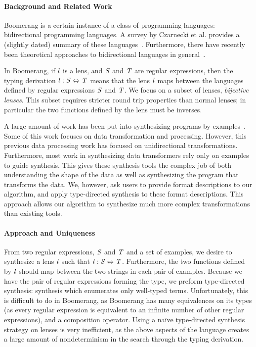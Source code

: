 \documentclass[a4paper,twoside]{article}
\begin{document}
\paragraph*{Background and Related Work}
Boomerang is a certain instance of a class of programming languages:
bidirectional programming languages.  A survey by Czarnecki et al. provides a (slightly dated)
summary of these languages~\cite{DBLP:conf/icmt/CzarneckiFHLST09}.  Furthermore, there have recently been
theoretical approaches to bidirectional languages in general~\cite{DBLP:journals/chinaf/FischerHP15}.

In Boomerang,
if $\mathit{l}$ is a lens, and $\mathit{S}$ and $\mathit{T}$ are regular expressions, then
the typing derivation $\mathit{l} : \mathit{S} \Leftrightarrow \mathit{T}$ means
that the lens $\mathit{l}$ maps between the languages defined by regular expressions
$\mathit{S}$ and $\mathit{T}$.  We focus on a subset of lenses, \emph{bijective
  lenses}.  This subset requires stricter round trip properties than normal
lenses; in particular the two functions defined by the lens must be inverses.

A large amount of work has been put into synthesizing programs by
examples~\cite{tds-pldi,le-pldi-2014,Singh:blinkfill,gulwani-popl-2014,morpheus}. 
Some of this work focuses on data transformation and processing.  However, this
previous data processing work has focused on unidirectional transformations.
Furthermore, most work in synthesizing data transformers rely only on examples
to guide synthesis.  This gives these synthesis tools the complex job of both
understanding the shape of the data as well as synthesizing the program that
transforms the data.  We, however, ask users to provide format descriptions to
our algorithm, and apply type-directed synthesis to these format descriptions.
This approach allows our algorithm to synthesize much more complex
transformations than existing tools.

\paragraph*{Approach and Uniqueness}
From two regular expressions, $\mathit{S}$ and $\mathit{T}$ and a set of examples, we
desire to synthesize a 
lens $\mathit{l}$ such that $\mathit{l} : \mathit{S} \Leftrightarrow \mathit{T}$.
Furthermore, the two functions defined by $\mathit{l}$ should map between the two
strings in each pair of examples.
Because we have the pair of regular expressions forming the type, we preform
type-directed synthesis: synthesis which enumerates only well-typed terms.
Unfortunately, this is difficult to do in Boomerang, as Boomerang has many
equivalences on its types (as every regular expression is equivalent to an
infinite number of other regular expressions), and a composition operator.
Using a na\"ive type-directed synthesis strategy on lenses is very inefficient,
as the above aspects of the language creates a large amount of nondeterminism in
the search through the typing derivation.
\end{document}
